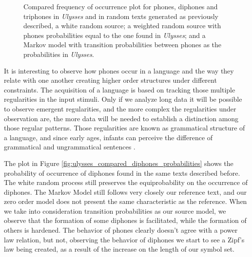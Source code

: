 \begin{figure}
\begin{tabular}{cc}
\end{tabular}
\caption{Compared frequency of occurrence plot for phones, diphones and triphones in \textit{Ulysses} and in random texts generated as previously described, a white random source; a weighted random source with phones probabilities equal to the one found in \textit{Ulysses}; and a Markov model with transition probabilities between phones as the probabilities in \textit{Ulysses}.}
\label{fig:ulysses_compared_nphones_probabilities}
\end{figure}


It is interesting to observe how phones occur in a language and the way they relate with one another
creating higher order structures under different constraints. The acquisition of a language is 
based on tracking those multiple regularities in the input stimuli. Only if we analyze long data
it will be possible to observe emergent regularities, and the more complex the regularities under
observation are, the more data will be needed to establish a distinction among those regular patterns.
Those regularities are known as grammatical structure of a language, and since early ages, 
infants can perceive the difference of grammatical and ungrammatical sentences \citep{Saffran2003}.


The plot in Figure \ref{fig:ulysses_compared_diphones_probabilities} 
shows the probability of occurrence of diphones found in the same texts described before.
The white random process still preserves the equiprobability on the occurrence of diphones.
The Markov Model still follows very closely our reference text, and our zero order model 
does not present the same characteristic as the reference. 
When we take into consideration transition probabilities as our source model, 
we observe that the formation of some diphones is facilitated, while the formation of others 
is hardened. The behavior of phones clearly doesn't agree with a power law relation, but
not, observing the behavior of diphones we start to see a Zipf's law being created, as a result
of the increase on the length of our symbol set.

